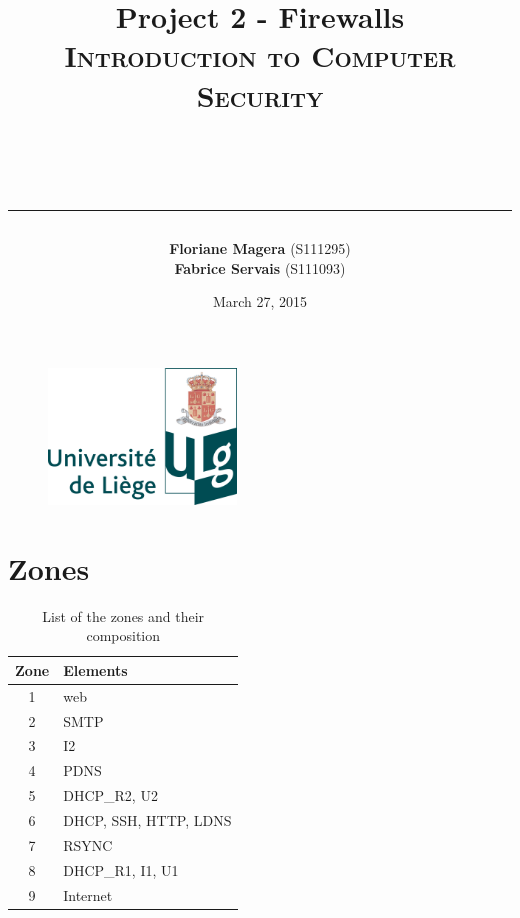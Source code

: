 \documentclass[a4paper,titlepage]{article}
\begin{document}
\begin{titlepage}

\begin{figure}
\centering
\includegraphics[width=5cm]{logo-ulg.png}
\end{figure}



\title{
\vspace{0.2cm}
\LARGE{\textbf{Project 2 - Firewalls}} \\ \textsc{Introduction to Computer Security}
\author{\textbf{Floriane Magera} \small{(S111295})\\\textbf{Fabrice Servais} \small{(S111093})}\\
\date{March 27, 2015}
\rule{15cm}{1.5pt}
}

\end{titlepage}

\pagestyle{fancy}

\maketitle

\section{Zones}
\label{sec:Zones}

\begin{table}[h]
	\center
	\begin{tabular}{c|l}
		Zone & Elements\\
		\hline
		1 & web\\
		2 & SMTP\\
		3 & I2\\
		4 & PDNS\\
		5 & DHCP\_R2, U2\\
		6 & DHCP, SSH, HTTP, LDNS\\
		7 & RSYNC\\
		8 & DHCP\_R1, I1, U1\\
		9 & Internet\\
	\end{tabular}
	\caption{List of the zones and their composition}
\end{table}
\end{document}
